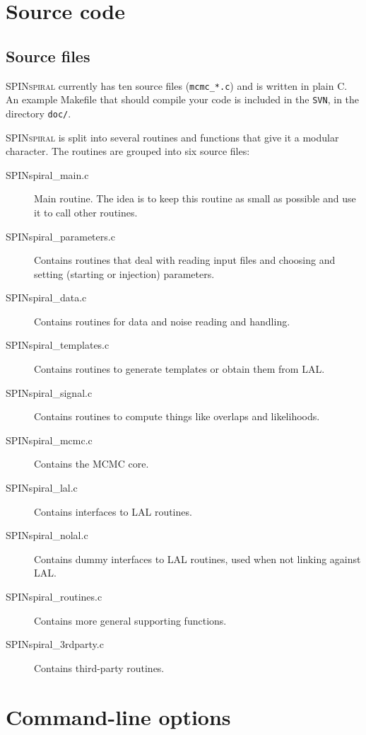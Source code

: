 \section{Source code}

\subsection{Source files}

\textsc{SPINspiral} currently has ten source files (\texttt{mcmc\_*.c}) and is written in plain C.
An example Makefile that should compile your code is included in the \texttt{SVN}, in the directory 
\texttt{doc/}.

\textsc{SPINspiral} is split into several routines and functions that give it a modular character.
The routines are grouped into six source files:

\begin{description}
\item[SPINspiral\_main.c] Main routine. The idea is to keep this routine as small as possible and use it to call other routines.
\item[SPINspiral\_parameters.c] Contains routines that deal with reading input files and choosing and setting (starting or injection) parameters.
\item[SPINspiral\_data.c] Contains routines for data and noise reading and handling.
\item[SPINspiral\_templates.c] Contains routines to generate templates or obtain them from LAL.
\item[SPINspiral\_signal.c] Contains routines to compute things like overlaps and likelihoods.
\item[SPINspiral\_mcmc.c] Contains the MCMC core.
\item[SPINspiral\_lal.c] Contains interfaces to LAL routines.
\item[SPINspiral\_nolal.c] Contains dummy interfaces to LAL routines, used when not linking against LAL.
\item[SPINspiral\_routines.c] Contains more general supporting functions.
\item[SPINspiral\_3rdparty.c] Contains third-party routines.
\end{description}





\pagebreak
\section{Command-line options}

